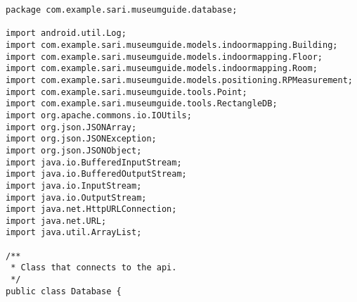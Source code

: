 \begin{lstlisting}package com.example.sari.museumguide.database;

import android.util.Log;
import com.example.sari.museumguide.models.indoormapping.Building;
import com.example.sari.museumguide.models.indoormapping.Floor;
import com.example.sari.museumguide.models.indoormapping.Room;
import com.example.sari.museumguide.models.positioning.RPMeasurement;
import com.example.sari.museumguide.tools.Point;
import com.example.sari.museumguide.tools.RectangleDB;
import org.apache.commons.io.IOUtils;
import org.json.JSONArray;
import org.json.JSONException;
import org.json.JSONObject;
import java.io.BufferedInputStream;
import java.io.BufferedOutputStream;
import java.io.InputStream;
import java.io.OutputStream;
import java.net.HttpURLConnection;
import java.net.URL;
import java.util.ArrayList;

/**
 * Class that connects to the api.
 */
public class Database {


\end{lstlisting}
